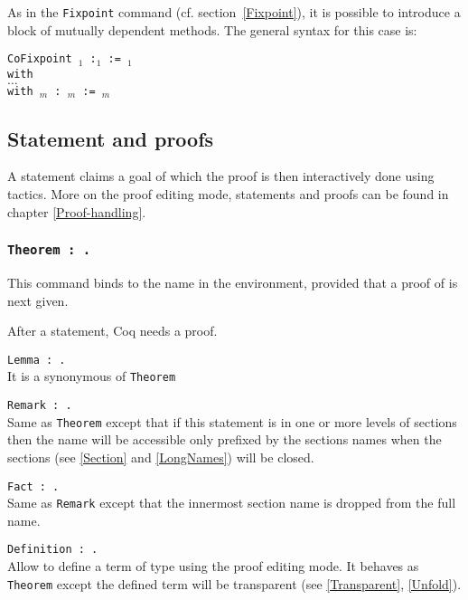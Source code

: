 As in the \texttt{Fixpoint} command (cf. section~\ref{Fixpoint}), it
is possible to introduce a block of mutually dependent methods. The
general syntax for this case is:

{\tt CoFixpoint {\ident$_1$}  :{\type$_1$} := {\term$_1$}\\
     with\\
        \mbox{}\hspace{0.1cm} $\ldots$  \\
        with {\ident$_m$}   : {\type$_m$} := {\term$_m$}}

\subsection{Statement and proofs}

A statement claims a goal of which the proof is then interactively done
using tactics. More on the proof editing mode, statements and proofs can be
found in chapter \ref{Proof-handling}.

\subsubsection{\tt Theorem {\ident} : {\type}.}
This command binds {\type} to the name {\ident} in the
environment, provided that a proof of {\type} is next given.

After a statement, Coq needs a proof.

\begin{Variants} 

\item {\tt Lemma {\ident} : {\type}.}\\ 
It is a synonymous of \texttt{Theorem}
\item {\tt Remark {\ident} : {\type}.}\\ 
Same as {\tt Theorem} except
that if this statement is in one or more levels of sections then the
name {\ident} will be accessible only prefixed by the sections names
when the sections (see \ref{Section} and \ref{LongNames}) will be
closed.
\item {\tt Fact {\ident} : {\type}.}\\ 
Same as {\tt Remark} except
that the innermost section name is dropped from the full name.
\item {\tt Definition {\ident} : {\type}.} \\
Allow to define a term of type {\type} using the proof editing mode. It
behaves as {\tt Theorem} except the defined term will be transparent (see
\ref{Transparent}, \ref{Unfold}). 
\end{Variants}

